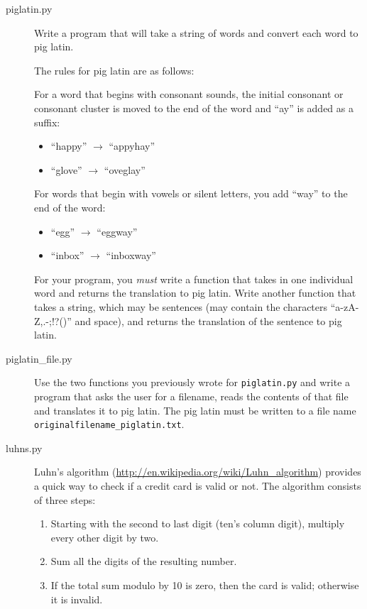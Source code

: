 \documentclass[11pt]{cselabheader}
\begin{document}
\begin{description}
  \item[piglatin.py] Write a program that will take a string of words and
    convert each word to pig latin. 

    The rules for pig latin are as follows:

    For a word that begins with consonant sounds, the initial consonant or
    consonant cluster is moved to the end of the word and ``ay'' is added as a
    suffix:
    \begin{itemize}
      \item ``happy'' $\to$ ``appyhay''
      \item ``glove'' $\to$ ``oveglay''
    \end{itemize}

    For words that begin with vowels or silent letters, you add ``way'' to the
    end of the word:
    \begin{itemize}
      \item ``egg'' $\to$ ``eggway''
      \item ``inbox'' $\to$ ``inboxway''
    \end{itemize}

    For your program, you \emph{must} write a function that takes in one
    individual word and returns the translation to pig latin. Write another
    function that takes a string, which may be sentences (may contain the
    characters ``a-zA-Z,.-;!?()'' and space), and returns the translation of the
    sentence to pig latin.

  \item[piglatin\_file.py] Use the two functions you previously wrote for
    \texttt{piglatin.py} and write a program that asks the user for a filename,
    reads the contents of that file and translates it to pig latin. The pig
    latin must be written to a file name
    \texttt{originalfilename\_piglatin.txt}.

  \item[luhns.py] Luhn's algorithm
    (\url{http://en.wikipedia.org/wiki/Luhn_algorithm}) provides a quick way to
    check if a credit card is valid or not. The algorithm consists of three
    steps:

    \begin{enumerate}
      \item Starting with the second to last digit (ten's column digit),
        multiply every other digit by two.
      \item Sum all the digits of the resulting number.
      \item If the total sum modulo by 10 is zero, then the card is valid;
        otherwise it is invalid.
    \end{enumerate}


\end{description}
\end{document}
